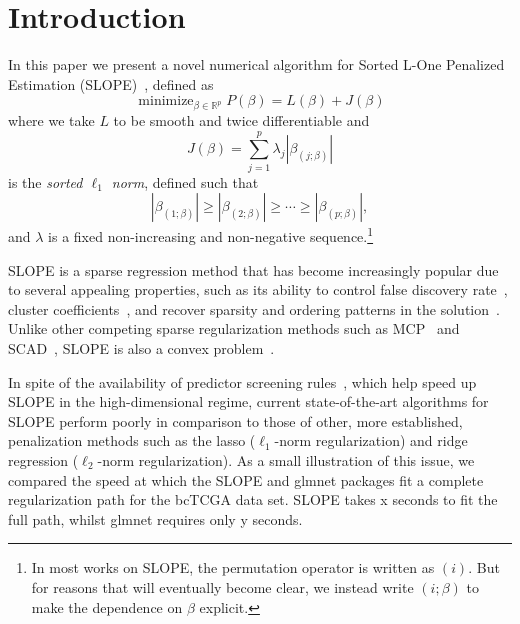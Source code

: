 \section{Introduction}\label{sec:introduction}

In this paper we present a novel numerical algorithm for Sorted L-One Penalized
Estimation (SLOPE)~\cite{bogdan2013, bogdan2015}, defined as
\begin{equation}
  \label{eq:slope-problem}
  \operatorname{minimize}_{\beta \in \mathbb{R}^p}
  P(\beta) = L(\beta) + J(\beta)
\end{equation}
where we take \(L\) to be smooth and twice differentiable and
\begin{equation}
  \label{eq:sorted-l1-norm}
  J(\beta) = \sum_{j=1}^p \lambda_j|\beta_{(j; \beta)}|
\end{equation}
is the \emph{sorted \(\ell_1\) norm}, defined such that
\[
  |\beta_{(1; \beta)}| \geq |\beta_{(2; \beta)}| \geq \cdots \geq |\beta_{(p; \beta)}|,
\]
and \(\lambda\) is a fixed non-increasing and non-negative
sequence.\footnote{In most works on SLOPE, the permutation operator is written
as \((i)\). But for reasons that will eventually become clear, we instead write
\((i; \beta)\) to make the dependence on \(\beta\) explicit.}

SLOPE is a sparse regression  method that has become increasingly popular due to
several appealing properties, such as its ability to control false discovery
rate~\cite{bogdan2015, kos2020}, cluster coefficients~\cite{figueiredo2016,
schneider2020a}, and recover sparsity and ordering patterns in the
solution~\cite{bogdan2022}. Unlike other competing sparse regularization methods such
as MCP~\cite{zhang2010} and SCAD~\cite{fan2001}, SLOPE is also a convex
problem~\cite{bogdan2015}.

In spite of the availability of predictor screening rules~\cite{elvira2022,
larsson2020c}, which help speed up SLOPE in the high-dimensional regime,
current state-of-the-art algorithms for SLOPE perform poorly in comparison to
those of other, more established, penalization methods such as the lasso
(\(\ell_1\)-norm regularization) and ridge regression (\(\ell_2\)-norm
regularization). As a small illustration of this issue, we compared the
speed at which the SLOPE and glmnet packages fit a complete regularization
path for the bcTCGA data set. SLOPE takes x seconds to fit the full path,
whilst glmnet requires only y seconds. 

